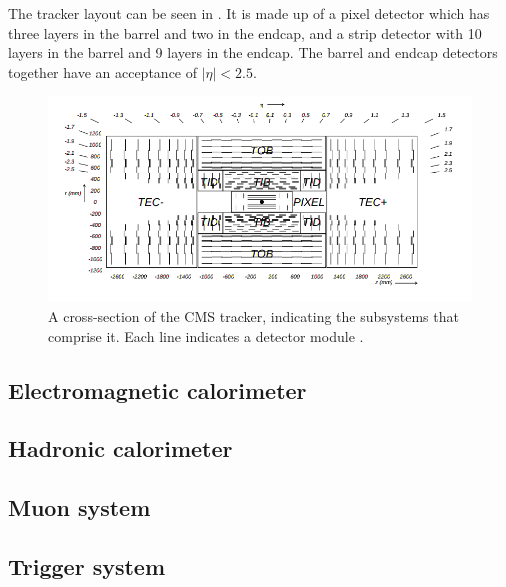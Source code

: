 The tracker layout can be seen in . It is made up of a pixel detector which has three layers in the barrel and two in the endcap, and a strip detector with 10 layers in the barrel and 9 layers in the endcap. The barrel and endcap detectors together have an acceptance of $|\eta|<2.5$.

\begin{figure}
  \includegraphics[width=1.2\largefigwidth]{plots/detector/TrackerSchematic.png}
  \caption{A cross-section of the CMS tracker, indicating the subsystems that comprise it. Each line indicates a detector module \cite{Chatrchyan:2008aa}.}
  \label{fig:trackerschematic}
\end{figure}

\subsection{Electromagnetic calorimeter}
\label{sec:ECAL}

\subsection{Hadronic calorimeter}
\label{sec:HCAL}

\subsection{Muon system}

\subsection{Trigger system}
\label{sec:triggers}

